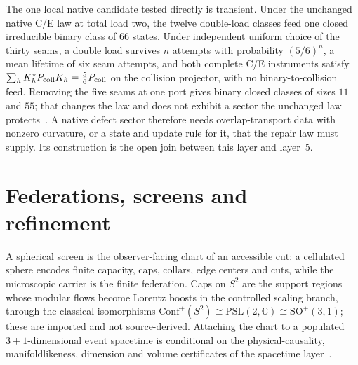 \documentclass[11pt]{article}
\theoremstyle{remark}
\theoremstyle{plain}
\begin{document}
The one local native candidate tested directly is transient. Under the
unchanged native C/E law at total load two, the twelve double-load classes
feed one closed irreducible binary class of \(66\) states. Under independent
uniform choice of the thirty seams, a double load survives \(n\) attempts with
probability \((5/6)^n\), a mean lifetime of six seam attempts, and both
complete C/E instruments satisfy
\(\sum_hK_h^*P_{\rm coll}K_h=\tfrac56P_{\rm coll}\) on the collision projector,
with no binary-to-collision feed. Removing the five seams at one port gives
binary closed classes of sizes \(11\) and \(55\); that changes the law and
does not exhibit a sector the unchanged law protects~\cite{ophmodel}. A
native defect sector therefore needs overlap-transport data with nonzero
curvature, or a state and update rule for it, that the repair law must
supply. Its construction is the open join between this layer and layer~5.

\section{Federations, screens and refinement}
\label{sec:federations-screens}

A spherical screen is the observer-facing chart of an accessible cut: a
cellulated sphere encodes finite capacity, caps, collars, edge centers and
cuts, while the microscopic carrier is the finite federation. Caps on
\(S^2\) are the support regions whose modular flows become Lorentz boosts in
the controlled scaling branch, through the classical isomorphisms
\(\mathrm{Conf}^+(S^2)\cong\mathrm{PSL}(2,\mathbb C)\cong\mathrm{SO}^+(3,1)\);
these are imported and not source-derived. Attaching the chart to a
populated \(3+1\)-dimensional event spacetime is conditional on the
physical-causality, manifoldlikeness, dimension and volume certificates of
the spacetime layer~\cite{ophEinstein}.
\end{document}

